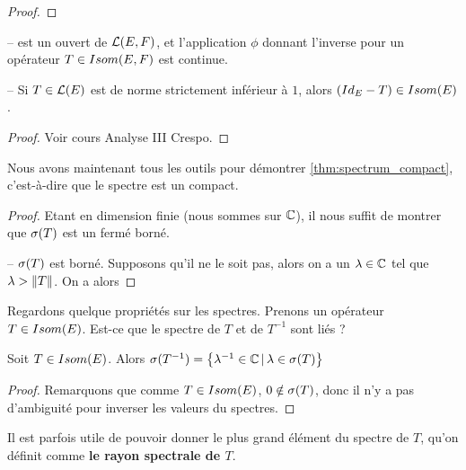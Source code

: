 \begin{proof}

\end{proof}

\begin{proposition}
	--  est un ouvert de $\mathcal{L}(E, F)$, et
	l'application $\phi$ donnant l'inverse pour un opérateur $T \in
	Isom(E, F)$ est continue.

	-- Si $T \in \mathcal{L}(E)$ est de norme strictement inférieur à $1$,
	alors $(Id_{E} - T) \in Isom(E)$.
\end{proposition}

\begin{proof}
	Voir cours Analyse III Crespo.
\end{proof}

Nous avons maintenant tous les outils pour démontrer
\ref{thm:spectrum_compact}, c'est-à-dire que le spectre est un compact.

\begin{proof}
	Etant en dimension finie (nous sommes sur $\mathbb{C}$), il nous suffit de
	montrer que $\sigma(T)$ est un fermé borné.

	-- $\sigma(T)$ est borné. Supposons qu'il ne le soit pas, alors on a un
	$\lambda \in \mathbb{C}$ tel que $\lambda > \norm{T}$. On a alors 
\end{proof}


Regardons quelque propriétés sur les spectres. Prenons un opérateur $T \in
Isom(E)$. Est-ce que le spectre de $T$ et de $T^{-1}$ sont liés ?

\begin{proposition}
	Soit $T \in Isom(E)$. Alors $\sigma(T^{-1}) =
	\left\{\lambda^{-1} \in \mathbb{C} \, | \, \lambda \in \sigma(T) \right\}$
\end{proposition}

\begin{proof}
	Remarquons que comme $T \in Isom(E)$, $0 \notin \sigma(T)$,
	donc il n'y a pas d'ambiguité pour inverser les valeurs du spectres.
\end{proof}

Il est parfois utile de pouvoir donner le plus grand élément du spectre de $T$, qu'on
définit comme \textbf{le rayon spectrale de $T$}.




